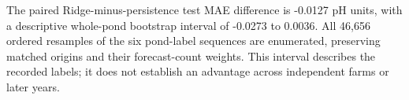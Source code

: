 The paired Ridge-minus-persistence test MAE difference is -0.0127 pH units, with a descriptive whole-pond bootstrap interval of -0.0273 to 0.0036. All 46,656 ordered resamples of the six pond-label sequences are enumerated, preserving matched origins and their forecast-count weights. This interval describes the recorded labels; it does not establish an advantage across independent farms or later years.